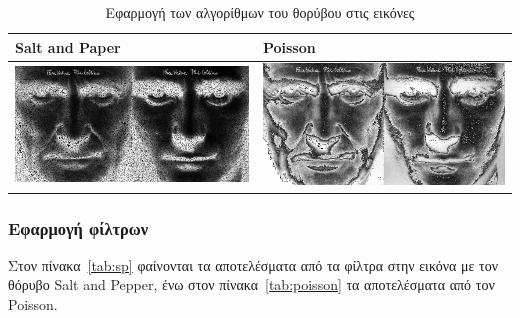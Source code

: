 \begin{table}[H]
  \centering
  \begin{tabular}{| p{8cm} | p{8cm}|}
    \hline
    \textbf{Salt and Paper} & \textbf{Poisson} \\
    \hline
    \includegraphics[width=\linewidth]{Figures/sp_noise} &
    \includegraphics[width=\linewidth]{Figures/poisson_noise} \\
    \hline
  \end{tabular}
  \caption{Εφαρμογή των αλγορίθμων του θορύβου στις εικόνες}
  \label{tab:noise}
\end{table}

\subsubsection{Εφαρμογή φίλτρων}

Στον πίνακα~\ref{tab:sp} φαίνονται τα αποτελέσματα από τα φίλτρα στην εικόνα με τον θόρυβο Salt and Pepper, ένω στον πίνακα~\ref{tab:poisson} τα αποτελέσματα από τον Poisson.

